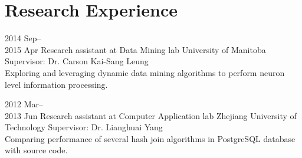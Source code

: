 \documentclass[]{friggeri-cv} %
\begin{document}
\section{Research Experience}
\begin{entrylist}
\entry
{2014 Sep--\\ 2015 Apr}
{Research assistant at Data Mining lab}
{University of Manitoba}
{Supervisor: Dr. Carson Kai-Sang Leung \\
	Exploring and leveraging dynamic data mining algorithms to perform neuron level information processing.
}

\entry
{2012 Mar--\\ 2013 Jun}
{Research assistant at Computer Application lab}
{Zhejiang University of Technology}
{Supervisor: Dr. Lianghuai Yang \\
Comparing performance of several hash join algorithms in PostgreSQL database with source code.
}

\end{entrylist}
\end{document}

